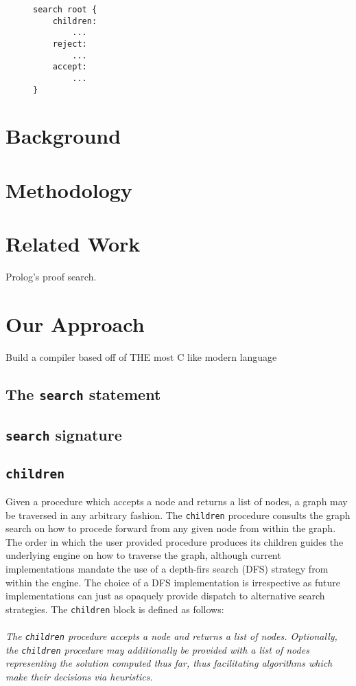 \documentclass[runningheads]{llncs}
\newcommand{\code}[1]{\texttt{#1}}
\begin{document}
\begin{figure}
\begin{lstlisting}[language=golang, style=boxed]
search root {
	children:
		...
	reject:
		...
	accept:
		...
}
\end{lstlisting}
\end{figure}

\section{Background}

\section{Methodology}

\section{Related Work}
Prolog's proof search.



\section{Our Approach}
Build a compiler based off of THE most C like modern language

\subsection{The \code{search} statement}

\subsection{\code{search} signature}

\subsection{\code{children}}
Given a procedure which accepts a node and returns a list of nodes, a graph may be traversed in any arbitrary fashion. The \code{children} procedure consults the graph search on how to procede forward from any given node from within the graph. The order in which the user provided procedure produces its children guides the underlying engine on how to traverse the graph, although current implementations mandate the use of a depth-firs search (DFS) strategy from within the engine. The choice of a DFS implementation is irrespective as future implementations can just as opaquely provide dispatch to alternative search strategies. The \code{children} block is defined as follows:
\\
\\
\textit{The \code{children} procedure accepts a node and returns a list of nodes. Optionally, the \code{children} procedure may additionally be provided with a list of nodes representing the solution computed thus far, thus facilitating algorithms which make their decisions via heuristics.}
\end{document}

